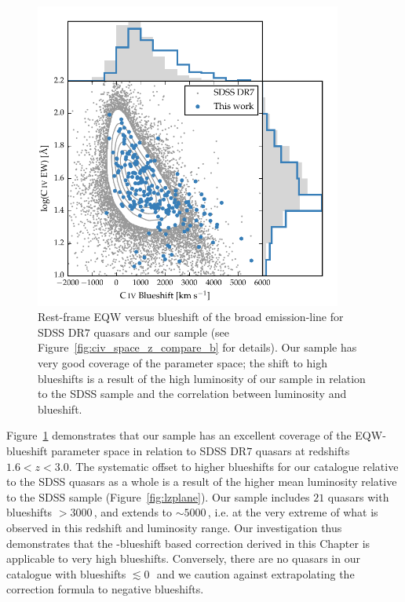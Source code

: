 \begin{figure}
    \centering
    \includegraphics[width=0.9\textwidth]{figures/chapter03/civ_space.pdf} 
    \caption[{Rest-frame EQW versus blueshift of the broad  emission-line for $32,157$ SDSS DR$7$ quasars at $1.6 < z < 3.0$ and our sample.}]{Rest-frame EQW versus blueshift of the broad  emission-line for SDSS DR$7$ quasars and our sample (see Figure~\ref{fig:civ_space_z_compare_b} for details). Our sample has very good coverage of the parameter space; the shift to high blueshifts is a result of the high luminosity of our sample in relation to the SDSS sample and the correlation between luminosity and blueshift.} 
    \label{fig:civ_space}
\end{figure}

Figure~\ref{fig:civ_space} demonstrates that our sample has an excellent coverage of the  EQW-blueshift parameter space in relation to SDSS DR$7$ quasars at redshifts $1.6 < z < 3.0$. 
The systematic offset to higher  blueshifts for our catalogue relative to the SDSS quasars as a whole is a result of the higher mean luminosity relative to the SDSS sample (Figure~\ref{fig:lzplane}).
Our sample includes $21$ quasars with  blueshifts $>3000$\,\kms, and extends to $\sim5000$\,\kms, i.e. at the very extreme of what is observed in this redshift and luminosity range. 
Our investigation thus demonstrates that the -blueshift based correction derived in this Chapter is applicable to very high blueshifts. 
Conversely, there are no quasars in our catalogue with  blueshifts $\lesssim0$\,\kms\, and we caution against extrapolating the correction formula to negative blueshifts. 

